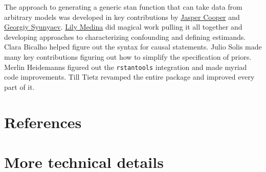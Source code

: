 \documentclass[
  article]{jss}
\newlength{\cslhangindent}
\newlength{\cslentryspacingunit} %
\newenvironment{CSLReferences}[2] %
 {%
  \setlength{\parindent}{0pt}
  \ifodd #1
  \let\oldpar\par
  \def\par{\hangindent=\cslhangindent\oldpar}
  \fi
  \setlength{\parskip}{#2\cslentryspacingunit}
 }%
 {}
\begin{document}
\begin{tcolorbox}[enhanced jigsaw, leftrule=.75mm, arc=.35mm, bottomrule=.15mm, rightrule=.15mm, toprule=.15mm, breakable, left=2mm, colback=white, opacityback=0, colframe=quarto-callout-color-frame]

The approach to generating a generic stan function that can take data
from arbitrary models was developed in key contributions by
\href{http://jasper-cooper.com/}{Jasper Cooper} and
\href{http://gsyunyaev.com/}{Georgiy Syunyaev}.
\href{https://lilymedina.github.io/}{Lily Medina} did magical work
pulling it all together and developing approaches to characterizing
confounding and defining estimands. Clara Bicalho helped figure out the
syntax for causal statements. Julio Solis made many key contributions
figuring out how to simplify the specification of priors. Merlin
Heidemanns figured out the \texttt{rstantools} integration and made
myriad code improvements. Till Tietz revamped the entire package and
improved every part of it.

\end{tcolorbox}

\hypertarget{references}{%
\section*{References}\label{references}}

\hypertarget{refs}{}
\begin{CSLReferences}{0}{0}
\end{CSLReferences}

\newpage{}

\hypertarget{sec-techdetails}{%
\section*{More technical details}\label{sec-techdetails}}
\end{document}
